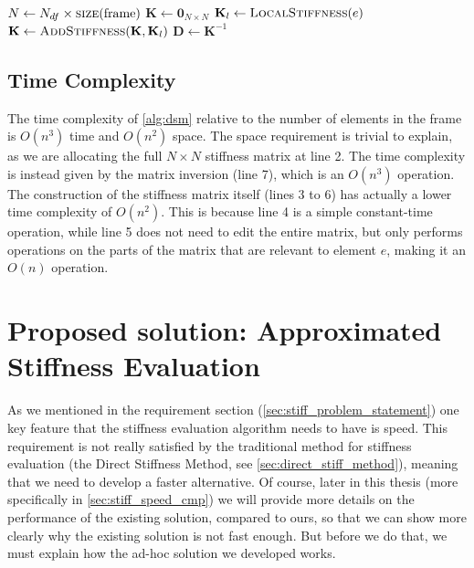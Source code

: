 \begin{algorithm}
\caption{Direct Stiffness Method}
\label{alg:dsm}
\begin{algorithmic}[1] %
    \State $N \gets N_{df} \times \Call{size}{\text{frame}}$ 
    \State $\mathbf{K} \gets \mathbf{0}_{N \times N}$ 
     
        \State $\mathbf{K}_l \gets \Call{LocalStiffness}{e}$ 
        \State $\mathbf{K} \gets \Call{AddStiffness}{\mathbf{K}, \mathbf{K}_l}$ 
    \EndFor
    \State $\mathbf{D} \gets \mathbf{K}^{-1}$ 
\end{algorithmic}
\end{algorithm}


\subsection{Time Complexity}

The time complexity of \cref{alg:dsm} relative to the number of elements in
the frame is $O(n^3)$ time and $O(n^2)$ space.
The space requirement is trivial to explain, as we are allocating the full $N \times N$
stiffness matrix at line 2.
The time complexity is instead given by the matrix inversion (line 7), which is an $O(n^3)$
operation.
The construction of the stiffness matrix itself (lines 3 to 6) has actually a lower time complexity
of $O(n^2)$. This is because line 4 is a simple constant-time operation, while line 5
does not need to edit the entire matrix, but only performs operations on the parts of the matrix
that are relevant to element $e$, making it an $O(n)$ operation.



\section{Proposed solution: Approximated Stiffness Evaluation}

As we mentioned in the requirement section (\cref{sec:stiff_problem_statement}) one key 
feature that the stiffness evaluation algorithm needs to have is speed.
This requirement is not really satisfied by the traditional method for stiffness
evaluation (the Direct Stiffness Method, see \cref{sec:direct_stiff_method}),
meaning that we need to develop a faster alternative.
Of course, later in this thesis (more specifically in \cref{sec:stiff_speed_cmp})
we will provide more details on the performance of the existing solution, compared to
ours, so that we can show more clearly why the existing solution is not fast enough.
But before we do that, we must explain how the ad-hoc solution we developed works.

